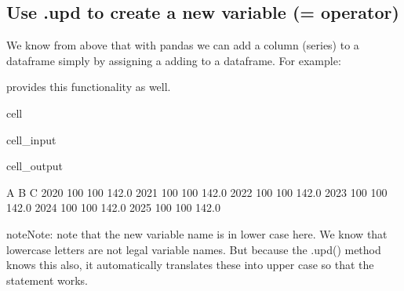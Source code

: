 \documentclass[letterpaper,10pt,english]{jupyterBook}
\begin{document}
\subsection{Use .upd to create a new variable (= operator)}
\label{\detokenize{content/04_PythonEssentials/UpdateCommand:use-upd-to-create-a-new-variable-operator}}
\sphinxAtStartPar
We know from above that with pandas we can add a column (series) to a dataframe simply by assigning a adding to a dataframe.  For example:

\sphinxAtStartPar
{}

\sphinxAtStartPar
{} provides this functionality as well.

\begin{sphinxuseclass}{cell}\begin{sphinxVerbatimInput}

\begin{sphinxuseclass}{cell_input}
\begin{sphinxVerbatim}[commandchars=\\\{\}]
\end{sphinxVerbatim}

\end{sphinxuseclass}\end{sphinxVerbatimInput}
\begin{sphinxVerbatimOutput}

\begin{sphinxuseclass}{cell_output}
\begin{sphinxVerbatim}[commandchars=\\\{\}]
        A    B      C
2020  100  100  142.0
2021  100  100  142.0
2022  100  100  142.0
2023  100  100  142.0
2024  100  100  142.0
2025  100  100  142.0
\end{sphinxVerbatim}

\end{sphinxuseclass}\end{sphinxVerbatimOutput}

\end{sphinxuseclass}
\begin{sphinxadmonition}{note}{Note:}
\sphinxAtStartPar
note that the new variable name is in lower case here.  We know that lowercase letters are not legal  variable names.  But because the .upd() method knows this also, it automatically translates these into upper case so that the statement works.
\end{sphinxadmonition}
\end{document}
